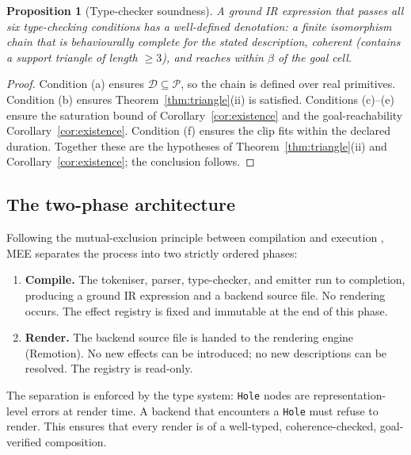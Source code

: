 \documentclass[twocolumn,11pt,a4paper]{article}
\theoremstyle{mee}
\newtheorem{proposition}[theorem]{Proposition}
\theoremstyle{definition}
\theoremstyle{remark}
\newcommand{\floor}{\beta}
\newcommand{\Desc}{\mathcal{D}}
\newcommand{\Phys}{\mathcal{P}}
\begin{document}
\begin{proposition}[Type-checker soundness]
\label{prop:soundness}
A ground IR expression that passes all six type-checking conditions has a
well-defined denotation: a finite isomorphism chain that is behaviourally
complete for the stated description, coherent (contains a support triangle
of length $\ge3$), and reaches within $\floor$ of the goal cell.
\end{proposition}

\begin{proof}
Condition (a) ensures $\Desc\subseteq\Phys$, so the chain is defined over
real primitives. Condition (b) ensures Theorem~\ref{thm:triangle}(ii) is
satisfied. Conditions (c)--(e) ensure the saturation bound of
Corollary~\ref{cor:existence} and the goal-reachability
Corollary~\ref{cor:existence}. Condition (f) ensures the clip fits within
the declared duration. Together these are the hypotheses of
Theorem~\ref{thm:triangle}(ii) and Corollary~\ref{cor:existence}; the
conclusion follows.
\end{proof}

\subsection{The two-phase architecture}

Following the mutual-exclusion principle between compilation and execution
\citep{turing1936,mccarthy1960}, MEE separates the process into two
strictly ordered phases:

\begin{enumerate}[leftmargin=1.4em,itemsep=2pt]
\item \textbf{Compile.} The tokeniser, parser, type-checker, and emitter
  run to completion, producing a ground IR expression and a backend
  source file. No rendering occurs. The effect registry is fixed and
  immutable at the end of this phase.
\item \textbf{Render.} The backend source file is handed to the rendering
  engine (Remotion). No new effects can be introduced; no new
  descriptions can be resolved. The registry is read-only.
\end{enumerate}

The separation is enforced by the type system: \texttt{Hole} nodes are
representation-level errors at render time. A backend that encounters a
\texttt{Hole} must refuse to render. This ensures that every render is of
a well-typed, coherence-checked, goal-verified composition.
\end{document}
